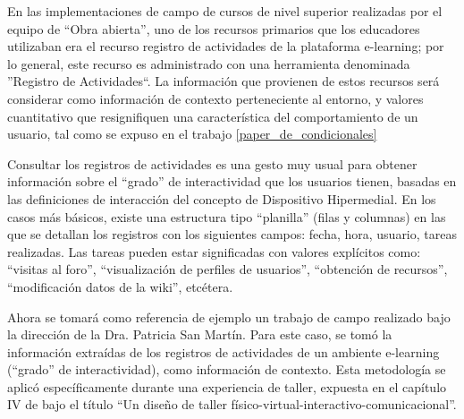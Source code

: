 En las implementaciones de campo de cursos de nivel superior realizadas por
el equipo de “Obra abierta”, uno de los recursos primarios que los educadores
utilizaban era el recurso registro de actividades de la plataforma e-learning; por lo general, este recurso es administrado con una herramienta denominada ''Registro de Actividades``.  La información que provienen de estos recursos será considerar como información de contexto perteneciente al entorno, y valores cuantitativo que resignifiquen una característica del comportamiento de un usuario, tal como se expuso en el trabajo \ref{paper_de_condicionales} 


Consultar los registros de actividades es una gesto muy usual para obtener
información sobre el “grado” de interactividad que los usuarios \cite{arqDHD3} tienen, basadas en las definiciones de interacción del concepto de Dispositivo Hipermedial. En los casos más básicos, existe una estructura tipo “planilla” (filas y columnas) en las que se detallan los registros con los siguientes campos: fecha, hora, usuario, tareas realizadas. Las tareas pueden estar significadas con valores explícitos como: “visitas al foro”, “visualización de perfiles de usuarios”, “obtención de recursos”, “modificación datos de la wiki”, etcétera.

Ahora se tomará como referencia de ejemplo un trabajo de campo realizado bajo la dirección de la Dra. Patricia San Martín. Para este caso, se tomó la información extraídas de los registros de actividades de un ambiente e-learning (“grado” de interactividad), como información de contexto. Esta metodología se aplicó específicamente durante una experiencia de taller, expuesta en el capítulo IV de \cite{DHD} bajo el título “Un diseño de taller físico-virtual-interactivo-comunicacional”.

